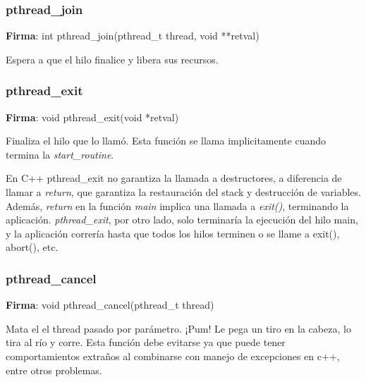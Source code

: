 \documentclass[a4paper, twoside]{article}
\begin{document}
\subsubsection{pthread\_join}
\textbf{Firma}: int pthread\_join(pthread\_t thread, void **retval)\par
Espera a que el hilo finalice y libera sus recursos.


\subsubsection{pthread\_exit}
\textbf{Firma}: void pthread\_exit(void *retval)\par
Finaliza el hilo que lo llamó. Esta función se llama implicitamente cuando termina la \emph{start\_routine}.

En C++ pthread\_exit no garantiza la llamada a destructores, a diferencia de llamar a \emph{return}, que garantiza la restauración del stack y destrucción de variables. Además, \emph{return} en la función \emph{main} implica una llamada a \emph{exit()}, terminando la aplicación. \emph{pthread\_exit}, por otro lado, solo terminaría la ejecución del hilo main, y la aplicación correría hasta que todos los hilos terminen o se llame a exit(), abort(), etc.

\subsubsection{pthread\_cancel}
\textbf{Firma}: void pthread\_cancel(pthread\_t thread)\par
Mata el el thread pasado por parámetro. ¡Pum! Le pega un tiro en la cabeza, lo tira al río y corre. Esta función debe evitarse ya que puede tener comportamientos extraños al combinarse con manejo de excepciones en c++, entre otros problemas.\\
\end{document}
